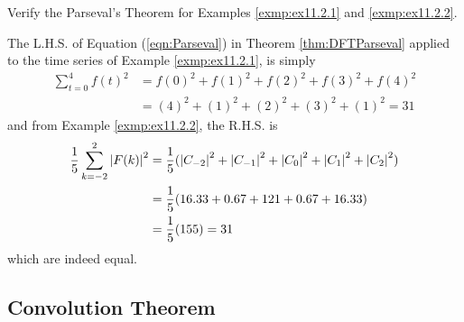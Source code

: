 \begin{exmp}
Verify the Parseval's Theorem for Examples \ref{exmp:ex11.2.1} and \ref{exmp:ex11.2.2}.
\end{exmp}
\begin{solution}
The L.H.S. of Equation (\ref{eqn:Parseval}) in Theorem \ref{thm:DFTParseval} applied to the time series of Example \ref{exmp:ex11.2.1}, is simply
\begin{align*}
\sum_{t=0}^{4} f(t)^2 &= f(0)^2 + f(1)^2 + f(2)^2 + f(3)^2 + f(4)^2 \\
&= (4)^2 + (1)^2 + (2)^2 + (3)^2 + (1)^2 = 31    
\end{align*}
and from Example \ref{exmp:ex11.2.2}, the R.H.S. is
\begin{align*}
\frac{1}{5}\sum_{k=-2}^{2} \abs{F(k)}^2 &= \frac{1}{5}(\abs{C_{-2}}^2 + \abs{C_{-1}}^2 + \abs{C_{0}}^2 + \abs{C_{1}}^2 + \abs{C_{2}}^2) \\
&= \frac{1}{5}(16.33 + 0.67 + 121 + 0.67 + 16.33) \\
&= \frac{1}{5} (155) = 31
\end{align*}
which are indeed equal.
\end{solution}

\subsection{Convolution Theorem}

